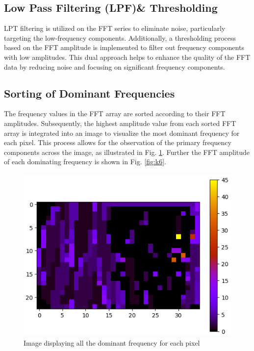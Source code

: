 \documentclass[conference]{IEEEtran}
\begin{document}
\subsection{Low Pass Filtering (LPF)\& Thresholding}

LPT filtering is utilized on the FFT series to eliminate noise, particularly targeting the low-frequency components. Additionally, a thresholding process based on the FFT amplitude is implemented to filter out frequency components with low amplitudes. This dual approach helps to enhance the quality of the FFT data by reducing noise and focusing on significant frequency components.

\subsection{Sorting of Dominant Frequencies}

The frequency values in the FFT array are sorted according to their FFT amplitudes. Subsequently, the highest amplitude value from each sorted FFT array is integrated into an image to visualize the most dominant frequency for each pixel. This process allows for the observation of the primary frequency components across the image, as illustrated in Fig. \ref{fig:k5}. Further the FFT amplitude of each dominating frequency is shown in Fig. \ref{fig:k6}.

		\begin{figure}[H]
	\includegraphics[scale=.51]{plot/freq.png}
	\caption{Image displaying all the dominant frequency for each pixel}\label{fig:k5}
\end{figure}
\end{document}
